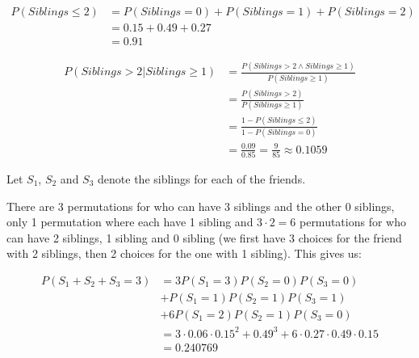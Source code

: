\documentclass[10pt, a4paper, english]{../Template/NTNUoving}
\begin{document}
\begin{oppgave}

    \begin{punkt}
        \begin{align*}
            P(Siblings \leq 2)
            &= P(Siblings = 0) + P(Siblings = 1) + P(Siblings = 2) \\
            &= 0.15 + 0.49 + 0.27 \\
            &= 0.91
        \end{align*}
    \end{punkt}

    \begin{punkt}
        \begin{align*}
            P(Siblings > 2 | Siblings \geq 1)
            &= \frac{P(Siblings > 2 \wedge Siblings \geq 1)}{P(Siblings \geq 1)} \\
            &= \frac{P(Siblings > 2)}{P(Siblings \geq 1)} \\
            &= \frac{1-P(Siblings \leq 2)}{1-P(Siblings = 0)} \\
            &= \frac{0.09}{0.85} = \frac{9}{85} \approx 0.1059
        \end{align*}
    \end{punkt}

    \begin{punkt}
        Let $S_1$, $S_2$ and $S_3$ denote the siblings for each of the friends.

        There are 3 permutations for who can have 3 siblings and the other 0 siblings,
        only 1 permutation where each have 1 sibling and $3\cdot2=6$ permutations for who can have 2 siblings, 1 sibling and 0 sibling
        (we first have 3 choices for the friend with 2 siblings, then 2 choices for the one with 1 sibling).
        This gives us:

        \begin{align*}
            P(S_1 + S_2 + S_3 = 3)
            &= 3P(S_1 = 3)P(S_2 = 0)P(S_3 = 0) \\
            &+ P(S_1 = 1)P(S_2 = 1)P(S_3 = 1) \\
            &+ 6P(S_1 = 2)P(S_2 = 1)P(S_3 = 0) \\
            &= 3\cdot0.06\cdot0.15^2 + 0.49^3 + 6\cdot0.27\cdot0.49\cdot0.15\\
            &= 0.240769
        \end{align*}
    \end{punkt}


\end{oppgave}
\end{document}
